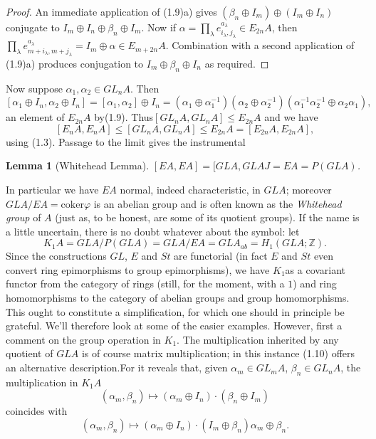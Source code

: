 \documentclass[openany,leqno]{book}  %
\newcommand{\coker}{\mathrm{coker}}
\newcommand{\Z}{\mathbb{Z}}
\newtheorem{lemma}[theorem]{Lemma}
\begin{document}
\begin{proof}
An immediate application of (1.9)a) gives $(\beta_n\oplus I_m)\oplus (I_m\oplus I_n)$ conjugate to
$I_m\oplus I_n \oplus \beta_n\oplus I_m $. Now if $\alpha =\prod_\lambda e_{i_\lambda,j_\lambda}^{a_\lambda}\in E_{2n}A$, then $\prod_\lambda e_{m+i_\lambda,m+j_\lambda}^{a_\lambda}=I_m\oplus \alpha \in E_{m+2n}A$. Combination with a second application of (1.9)a) produces conjugation to $I_m\oplus\beta_n \oplus I_n$ as required.
\end{proof}

Now suppose $\alpha_1,\alpha_2\in GL_nA$. Then
\[[\alpha_1\oplus I_n,\alpha_2\oplus I_n]=[\alpha_1,\alpha_2]\oplus I_n=(\alpha_1\oplus \alpha_1^{-1})(\alpha_2\oplus \alpha_2^{-1})(\alpha_1^{-1}\alpha_2^{-1}\oplus \alpha_2\alpha_1 ),\]
an element of $E_{2n}A$ by(1.9). Thus$[GL_nA,GL_nA]\leqslant E_{2n}A$ and we have
\[[E_nA,E_nA]\leqslant [GL_nA,GL_nA]\leqslant E_{2n}A=[E_{2n}A,E_{2n}A],\]
using (1.3). Passage to the limit gives the instrumental
\begin{lemma}[Whitehead Lemma]
$[EA,EA]=[GLA,GLAJ=EA=P(GLA)$.
\end{lemma}

In particular we have $EA$ normal, indeed characteristic, in $GLA$; moreover $GLA/EA=\coker \varphi$ is an abelian group and is often known as the {\em Whitehead group} of $A$ (just as, to be honest, are some of its quotient groups). If the name is a little uncertain, there is no doubt whatever about the symbol: let
\[K_1A=GLA/P(GLA)=GLA/EA=GLA_{ab}=H_1(GLA;\Z).\]
Since the constructions $GL$, $E$ and $St$ are functorial (in fact $E$ and $St$ even convert ring epimorphisms to group epimorphisms), we have $K_1$as a covariant functor from the category of rings (still, for the moment, with a $1$) and ring homomorphisms to the category of abelian groups and group homomorphisms. This ought to constitute a simplification, for which one should in principle be grateful. We'll therefore look at some of the easier examples. However, first a comment on the group operation in $K_1$. The multiplication inherited by any quotient of $GLA$ is of course matrix multiplication; in this instance (1.10) offers an alternative description.For it reveals that, given $\alpha_m \in GL_m A$, $\beta_n\in GL_n A$, the multiplication in $K_1A$
\[(\alpha_m,\beta_n)\mapsto (\alpha_m\oplus I_n)\cdot(\beta_n\oplus I_m)\]
coincides with
\[(\alpha_m,\beta_n)\mapsto (\alpha_m\oplus I_n)\cdot(I_m\oplus \beta_n )\alpha_m\oplus\beta_n.\]
\end{document}
